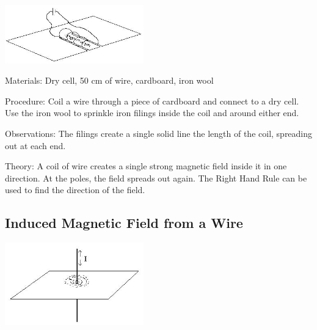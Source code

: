 \begin{multicols}{2}
\begin{center}
\includegraphics[width=0.45\textwidth]{./img/induced-mag-field-coil.png}
\end{center}

\begin{description*}
\item[Materials:]{Dry cell, 50 cm of wire, cardboard, iron wool}
\item[Procedure:]{Coil a wire through a piece of cardboard and connect to a dry cell. Use the iron wool to sprinkle iron filings inside the coil and around either end.}
\item[Observations:]{The filings create a single solid line the length of the coil, spreading out at each end.}
\item[Theory:]{A coil of wire creates a single strong magnetic field inside it in one direction. At the poles, the field spreads out again. The Right Hand Rule can be used to find the direction of the field.}
\end{description*}

\subsection{Induced Magnetic Field from a Wire}

\begin{center}
\includegraphics[width=0.45\textwidth]{./img/induced-mag-field-wire.png}
\end{center}


\end{multicols}
